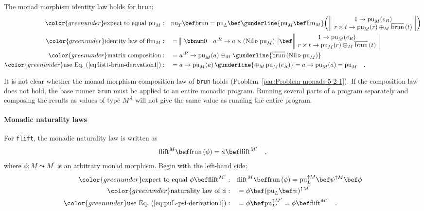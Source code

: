 The monad morphism identity law holds for \lstinline!brun!:
\begin{align*}
{\color{greenunder}\text{expect to equal }\text{pu}_{M}:}\quad & \text{pu}_{T}\bef\text{brun}=\text{pu}_{L}\bef\gunderline{\text{pu}_{M}\bef\text{flm}_{M}}\bigg(\,\begin{array}{||c|}
1\rightarrow\text{pu}_{M}(e_{R})\\
r\times t\rightarrow\text{pu}_{M}(r)\oplus_{M}\overline{\text{brun}}\,(t)
\end{array}\,\bigg)\\
{\color{greenunder}\text{identity law of }\text{flm}_{M}:}\quad & =\begin{array}{||cc|}
\bbnum 0 & a^{:R}\rightarrow a\times(\text{Nil}\triangleright\text{pu}_{M})\end{array}\,\bef\,\begin{array}{||c|}
1\rightarrow\text{pu}_{M}(e_{R})\\
r\times t\rightarrow\text{pu}_{M}(r)\oplus_{M}\overline{\text{brun}}\,(t)
\end{array}\\
{\color{greenunder}\text{matrix composition}:}\quad & =a^{:R}\rightarrow\text{pu}_{M}(a)\oplus_{M}\gunderline{\overline{\text{brun}}\,(\text{Nil}\triangleright\text{pu}_{M})}\\
{\color{greenunder}\text{use Eq.~(\ref{eq:listt-brun-derivation1})}:}\quad & =a\rightarrow\text{pu}_{M}(a)\,\gunderline{\oplus_{M}\,\text{pu}_{M}(e_{R})}=a\rightarrow\text{pu}_{M}(a)=\text{pu}_{M}\quad.
\end{align*}

It is not clear whether the monad morphism composition law of \lstinline!brun!
holds (Problem~\ref{par:Problem-monads-5-2-1}). If the composition
law does not hold, the base runner \lstinline!brun! must be applied
to an entire monadic program. Running several parts of a program separately
and composing the results as values of type $M^{A}$ will not give
the same value as running the entire program.

\paragraph{Monadic naturality laws}

For \lstinline!flift!, the monadic naturality law is written as
\[
\text{flift}^{M}\bef\text{frun}\,(\phi)=\phi\bef\text{flift}^{M^{\prime}}\quad,
\]
where $\phi:M\leadsto M^{\prime}$ is an arbitrary monad morphism.
Begin with the left-hand side:
\begin{align*}
{\color{greenunder}\text{expect to equal }\phi\bef\text{flift}^{M^{\prime}}:}\quad & \text{flift}^{M}\bef\text{frun}\,(\phi)=\text{pu}_{L}^{\uparrow M}\bef\psi^{\uparrow M}\bef\phi\\
{\color{greenunder}\text{naturality law of }\phi:}\quad & =\phi\bef(\text{pu}_{L}\bef\psi)^{\uparrow M}\\
{\color{greenunder}\text{use Eq.~(\ref{eq:puL-psi-derivation1})}:}\quad & =\phi\bef\text{pu}_{L^{\prime}}^{\uparrow M^{\prime}}=\phi\bef\text{flift}^{M^{\prime}}\quad.
\end{align*}


